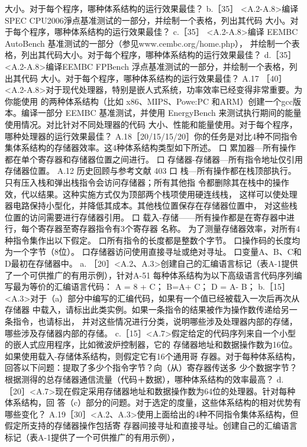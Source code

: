 大小。对于每个程序，哪种体系结构的运行效果最佳？
b.［35］ <A.2-A.8>编译 SPEC CPU2006淨点基准测试的一部分，并绘制一个表格，列出其代码
大小。对于每个程序，哪种体系结构的运行效果最佳？
c.［35］ <A.2-A.8>编译 EEMBC AutoBench 基准测试的一部分（参见www.cembc.org/home.php），
并绘制一个表格，列出其代码大小。对于每个程序，哪种体系结构的运行效果最佳？
d.［35］<A.2-A.8>编译EEMBC FPBench 浮点基准测试的一部分，并绘制一个表格，列出其代码
大小。对于每个程序，哪种体系结构的运行效果最佳？
A.17 ［40］<A.2-A.8>对于现代处理器，特别是嵌人式系统，功率效率已经变得非常重要。为你能使用
的两种体系结构（比如 x86、MIPS、Powe:PC 和ARM）创建一个gcc版本。编译一部分 EEMBC
基准测试，并使用 EnergyBench 来测试执行期间的能量使用情况。对比针对不同处理器的代码
大小、性能和能量使用。对于每个程序，哪种处理器的运行效果最佳？
A.18［20/15/15/20］你的任务是对比4种不同指令集体系结构的存储器效率。这4种体系结构类型如下所述。
口 累加器—所有操作都在单个寄存器和存储器位置之间进行。
口 存储器-存储器—所有指令地址仅引用存储器位置。
A.12 历史回顾与参考文献
403
口 栈—所有操作都在栈顶部执行。只有压入栈和弹出栈指令会访问存储器；所有其他指
令都删除其在栈中的操作效，代以结果。这种实施方式仅为顶部两个栈项使用硬连线栈，
这样可以使处理器电路保持小型化，并降低其成本。其他栈位置保存在存储器位置中，
对这些栈位置的访问需要进行存储器引用。
口 载入-存储——所有操作都是在寄存器中进行，每个寄存器至寄存器指令有3个寄存器
名称。
为了测量存储器效率，对所有4种指令集作出以下假定。
口所有指令的长度都是整数个字节。
口操作码的长度均为一个字节（8位）。
口存储器访问使用直接寻址或绝对寻址。
口变量A、B、C和D最初在存储器中。
a. ［20］<A.2、A.3>创建自己的汇编语言标记（表A-1提供了一个可供推广的有用示例），针对A-51
每种体系结构为以下高级语言代码序列编写最为等价的汇编语言代码：
A = 8 + C；
B=A+ C；
D = A- B；
b.［15］<A.3>对于（a）部分中编写的汇编代码，如果有一个值已经被载入一次后再次从存储器
中载入，请标出此类实例。如果一条指令的结果被作为操作数传递给另一条指令，也请标出，
并对这些情况进行分类，说明哪些涉及处理器内部的存储，哪些涉及存储器内部的存储。
c.［15］<A.7>假定给定的代码序列来自一个小型的嵌人式应用程序，比如微波炉控制器，它的
存储器地址和数据操作数为16位。如果使用载入-存储体系结构，则假定它有16个通用哥
存器。对于每种体系结构，回答以下问题：提取了多少个指令字节？向（从）寄存器传送多
少个数据字节？根据测得的总存储器通信流量（代码＋数据），哪种体系结构的效率最高？
d. ［20］<A.7>现在假定采用存储器地址和数据操作数为64位的处理器。针对每种体系结构，回
答（c）部分的问题。对于选定的度量，这些体系结构的相对优势有哪些变化？
A.19［30］<A.2、A.3>使用上面给出的4种不同指令集体系结构，但假定所支持的存储器操作包括寄
存器间接寻址和直接寻址。创建自己的汇编语言标记（表A-1提供了一个可供推广的有用示例），
